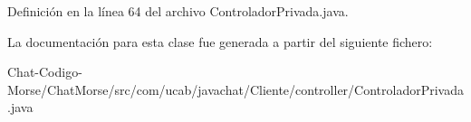 Definición en la línea 64 del archivo Controlador\-Privada.\-java.



La documentación para esta clase fue generada a partir del siguiente fichero\-:\begin{DoxyCompactItemize}
\item 
Chat-\/\-Codigo-\/\-Morse/\-Chat\-Morse/src/com/ucab/javachat/\-Cliente/controller/Controlador\-Privada.\-java\end{DoxyCompactItemize}
